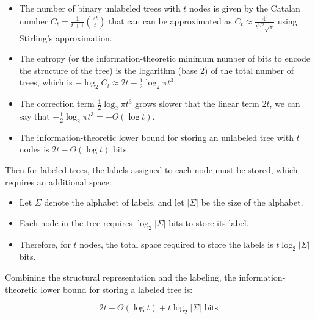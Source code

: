 \begin{itemize}
    \item The number of binary unlabeled trees with $t$ nodes is given by the Catalan number $C_t = \frac{1}{t+1} \binom{2t}{t}$ that can can be approximated as $C_t \approx \frac{4^t}{t^{3/2}\sqrt{\pi}}$ using Stirling's approximation.
    \item The entropy (or the information-theoretic minimum number of bits to encode the structure of the tree) is the logarithm (base 2) of the total number of trees, which is $-\log_2 C_t \approx 2t - \frac{1}{2} \log_2 \pi t^3$.
    \item The correction term $\frac{1}{2} \log_2 \pi t^3$ grows slower that the linear term $2t$, we can say that $-\frac{1}{2} \log_2 \pi t^3 = -\Theta(\log t)$.
    \item The information-theoretic lower bound for storing an unlabeled tree with $t$ nodes is $2t - \Theta(\log t)$ bits.
\end{itemize}

Then for labeled trees, the labels assigned to each node must be stored, which requires an additional space:

\begin{itemize}
    \item Let $\Sigma$ denote the alphabet of labels, and let $|\Sigma|$ be the size of the alphabet.
    \item Each node in the tree requires $\log_2 |\Sigma|$ bits to store its label.
    \item Therefore, for $t$ nodes, the total space required to store the labels is $t \log_2 |\Sigma|$ bits.
\end{itemize}

Combining the structural representation and the labeling, the information-theoretic lower bound for storing a labeled tree is:

$$
    2t - \Theta(\log t) + t \log_2 |\Sigma| \text{ bits}
$$